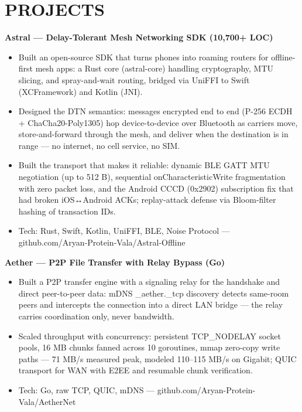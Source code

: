 \documentclass[9pt]{article}
\begin{document}
\section*{PROJECTS}
\textbf{Astral  ---  Delay-Tolerant Mesh Networking SDK (10,700+ LOC)}
\vspace{1pt}
\begin{itemize}[leftmargin=11pt,itemsep=0pt,topsep=1pt,parsep=0pt]
\item Built an open-source SDK that turns phones into roaming routers for offline-first mesh apps: a Rust core (astral-core) handling cryptography, MTU slicing, and spray-and-wait routing, bridged via UniFFI to Swift (XCFramework) and Kotlin (JNI).
\item Designed the DTN semantics: messages encrypted end to end (P-256 ECDH + ChaCha20-Poly1305) hop device-to-device over Bluetooth as carriers move, store-and-forward through the mesh, and deliver when the destination is in range  ---  no internet, no cell service, no SIM.
\item Built the transport that makes it reliable: dynamic BLE GATT MTU negotiation (up to 512 B), sequential onCharacteristicWrite fragmentation with zero packet loss, and the Android CCCD (0x2902) subscription fix that had broken iOS↔Android ACKs; replay-attack defense via Bloom-filter hashing of transaction IDs.
\item Tech: Rust, Swift, Kotlin, UniFFI, BLE, Noise Protocol  ---  github.com/Aryan-Protein-Vala/Astral-Offline
\end{itemize}
\textbf{Aether  ---  P2P File Transfer with Relay Bypass (Go)}
\vspace{1pt}
\begin{itemize}[leftmargin=11pt,itemsep=0pt,topsep=1pt,parsep=0pt]
\item Built a P2P transfer engine with a signaling relay for the handshake and direct peer-to-peer data: mDNS \_aether.\_tcp discovery detects same-room peers and intercepts the connection into a direct LAN bridge  ---  the relay carries coordination only, never bandwidth.
\item Scaled throughput with concurrency: persistent TCP\_NODELAY socket pools, 16 MB chunks fanned across 10 goroutines, mmap zero-copy write paths  ---  71 MB/s measured peak, modeled 110–115 MB/s on Gigabit; QUIC transport for WAN with E2EE and resumable chunk verification.
\item Tech: Go, raw TCP, QUIC, mDNS  ---  github.com/Aryan-Protein-Vala/AetherNet
\end{itemize}
\end{document}
